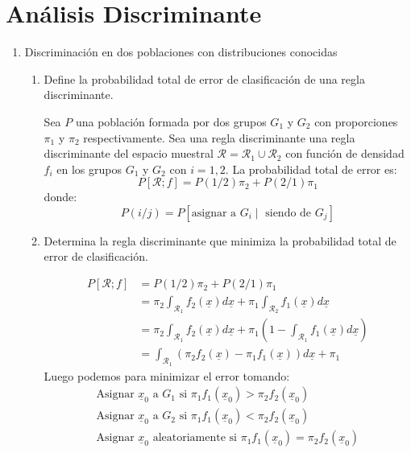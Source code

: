 \documentclass[twoside]{article}
\newcommand{\muestra}[1]{{\underline{#1}}}
\newcommand{\m}[1]{{\muestra{#1}}}
\begin{document}
\section{Análisis Discriminante}
\begin{enumerate}
\item Discriminación en dos poblaciones con distribuciones conocidas
\begin{enumerate}
	\item Define la probabilidad total de error de clasificación de una regla discriminante.

	\begin{sol}
	Sea $P$ una población formada por dos grupos $G_1$ y $G_2$ con proporciones $\pi_1$ y $\pi_2$ respectivamente.
	Sea una regla discriminante una regla discriminante del espacio muestral $\mathcal{R} = \mathcal{R}_1 \cup \mathcal{R}_2$ con función de densidad $f_i$ en los grupos $G_1$ y $G_2$ con $i=1,2$.
	La probabilidad total de error es:
	\[ P[\mathcal{R}; f] = P(1/2) \pi_2 + P(2/1)\pi_1 \]
	donde:
	\[ P(i/j) = P[\text{asignar a }G_i\mid\text{ siendo de }G_j]\]
	\end{sol}

	\item Determina la regla discriminante que minimiza la probabilidad total de error de clasificación.

	\begin{sol}
	\begin{align*}
	P[\mathcal{R}; f] & = P(1/2)\pi_2 + P(2/1)\pi_1\\
	& = \pi_2 \int_{\mathcal{R}_1} f_2(\m{x}) d \m{x} + \pi_1 \int_{\mathcal{R}_2} f_1(\m{x}) d \m{x}\\
	& = \pi_2 \int_{\mathcal{R}_1} f_2(\m{x}) d\m{x} + \pi_1 \left(1 - \int_{\mathcal{R}_1} f_1(\m{x}) d\m{x}\right)\\
	& = \int_{\mathcal{R}_1} (\pi_2 f_2(\m{x}) - \pi_1 f_1(\m{x})) d\m{x} + \pi_1
	\end{align*}
	Luego podemos para minimizar el error tomando:
	\begin{align*}
	\text{Asignar }\m{x}_0\text{ a }G_1\text{ si }\pi_1 f_1(\m{x}_0) > \pi_2 f_2(\m{x}_0)\\
	\text{Asignar }\m{x}_0\text{ a }G_2\text{ si }\pi_1 f_1(\m{x}_0) < \pi_2 f_2(\m{x}_0)\\
	\text{Asignar }\m{x}_0\text{ aleatoriamente si } \pi_1 f_1(\m{x}_0) = \pi_2 f_2(\m{x}_0)\\
	\end{align*}
	\end{sol}


\end{enumerate}
\end{enumerate}
\end{document}
